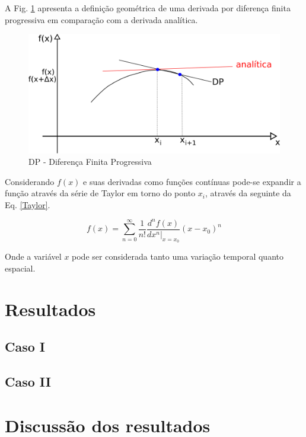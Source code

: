\documentclass[12pt,a4paper,final]{report}%
\begin{document}
A Fig. \ref{DF} apresenta a definição geométrica de uma derivada por diferença finita progressiva em comparação com a derivada analítica.

\begin{figure}[H]
\centering
\includegraphics[scale=1.2]{Imagens/DP.png}
\caption{DP - Diferença Finita Progressiva}
\label{DF}
\end{figure}


Considerando $f(x)$ e suas derivadas como funções contínuas pode-se expandir a função através da série de Taylor em torno do ponto $x_{i}$, através da seguinte da Eq. \ref{Taylor}.

\begin{equation}
f(x)=\sum^{\infty}_{n=0}\frac{1}{n!}\frac{d^{n}f(x)}{dx^{n}|_{x=x_{0}}}(x-x_{0})^{n}
\label{Taylor}
\end{equation}

Onde a variável $x$ pode ser considerada tanto uma variação temporal quanto espacial.








\section*{Resultados}
\subsection*{Caso I}

\subsection*{Caso II}



\section*{Discussão dos resultados}
\end{document}
